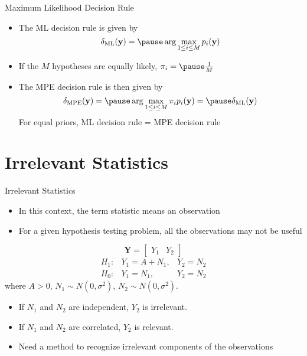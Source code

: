 \documentclass[t]{beamer}
\begin{document}
\begin{frame}{Maximum Likelihood Decision Rule}
  \footnotesize
  \begin{itemize}
    \item The ML decision rule is given by
    \begin{equation*}
      \delta_{\text{ML}}(\mathbf{y}) = \pause \arg\max_{1\leq i \leq M} p_i(\mathbf{y})
    \end{equation*}
    \item \pause If the $M$ hypotheses are equally likely, $\pi_i = \pause \frac{1}{M}$ 
    \item \pause The MPE decision rule is then given by
    \begin{equation*}
      \delta_{\text{MPE}}(\mathbf{y}) = \pause \arg\max_{1\leq i \leq M} \pi_i p_i(\mathbf{y}) = \pause \delta_{\text{ML}} (\mathbf{y})
    \end{equation*}
    \pause
    \alert{For equal priors, ML decision rule = MPE decision rule}
  \end{itemize}
  \normalsize
\end{frame}

\section{Irrelevant Statistics}
\begin{frame}{Irrelevant Statistics}
  \footnotesize
  \begin{itemize}
    \item In this context, the term statistic means an observation
    \pause
    \item For a given hypothesis testing problem, all the observations may not be useful
    \pause
  \end{itemize}
  \begin{example}
    \begin{equation*}
      \mathbf{Y} = \begin{bmatrix} Y_1 & Y_2 \end{bmatrix}
    \end{equation*}
    \pause
    \begin{equation*}
      \begin{array}{lll}
        H_1 : & Y_1 = A+N_1,& Y_2 = N_2 \\
        H_0 : & Y_1 = N_1,& Y_2 = N_2 
      \end{array}
    \end{equation*}
    where $A >0$, $N_1 \sim N(0,\sigma^2)$, $N_2 \sim N(0,\sigma^2)$.
    \begin{itemize}
      \item \pause If $N_1$ and $N_2$ are independent, $Y_2$ is irrelevant.
      \item \pause If $N_1$ and $N_2$ are correlated, $Y_2$ is relevant.
    \end{itemize}
  \end{example}
  \begin{itemize}
    \item \pause Need a method to recognize irrelevant components of the observations
  \end{itemize}
  \normalsize
\end{frame}
\end{document}
